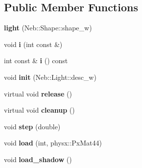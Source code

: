 \subsection*{\-Public \-Member \-Functions}
\begin{DoxyCompactItemize}
\item 
\hypertarget{classNeb_1_1Light_1_1light_acbadec87285664fabca7fb91531fc98f}{{\bfseries light} (\-Neb\-::\-Shape\-::shape\-\_\-w)}\label{classNeb_1_1Light_1_1light_acbadec87285664fabca7fb91531fc98f}

\item 
\hypertarget{classNeb_1_1Light_1_1light_ab40f95643e4ee5d0906762985a6d5913}{void {\bfseries i} (int const \&)}\label{classNeb_1_1Light_1_1light_ab40f95643e4ee5d0906762985a6d5913}

\item 
\hypertarget{classNeb_1_1Light_1_1light_aa9f46d260fdc0b4b1850558afa180c47}{int const \& {\bfseries i} () const }\label{classNeb_1_1Light_1_1light_aa9f46d260fdc0b4b1850558afa180c47}

\item 
\hypertarget{classNeb_1_1Light_1_1light_a3735a7200a8701266c01249209c8e798}{void {\bfseries init} (\-Neb\-::\-Light\-::desc\-\_\-w)}\label{classNeb_1_1Light_1_1light_a3735a7200a8701266c01249209c8e798}

\item 
\hypertarget{classNeb_1_1Light_1_1light_a89cd0d5a903d9e1a30a6ce5ddc447f63}{virtual void {\bfseries release} ()}\label{classNeb_1_1Light_1_1light_a89cd0d5a903d9e1a30a6ce5ddc447f63}

\item 
\hypertarget{classNeb_1_1Light_1_1light_a4a54a2d5b9c8befb0b0288e44995c6eb}{virtual void {\bfseries cleanup} ()}\label{classNeb_1_1Light_1_1light_a4a54a2d5b9c8befb0b0288e44995c6eb}

\item 
\hypertarget{classNeb_1_1Light_1_1light_aef116ee5b33e7d4c2f2cfc8ffacfbc27}{void {\bfseries step} (double)}\label{classNeb_1_1Light_1_1light_aef116ee5b33e7d4c2f2cfc8ffacfbc27}

\item 
\hypertarget{classNeb_1_1Light_1_1light_ace2fc60d9cf8dd49983b808e245d3d38}{void {\bfseries load} (int, physx\-::\-Px\-Mat44)}\label{classNeb_1_1Light_1_1light_ace2fc60d9cf8dd49983b808e245d3d38}

\item 
\hypertarget{classNeb_1_1Light_1_1light_a1418ba588189bef5787d1fbd090d773a}{void {\bfseries load\-\_\-shadow} ()}\label{classNeb_1_1Light_1_1light_a1418ba588189bef5787d1fbd090d773a}


\end{DoxyCompactItemize}
